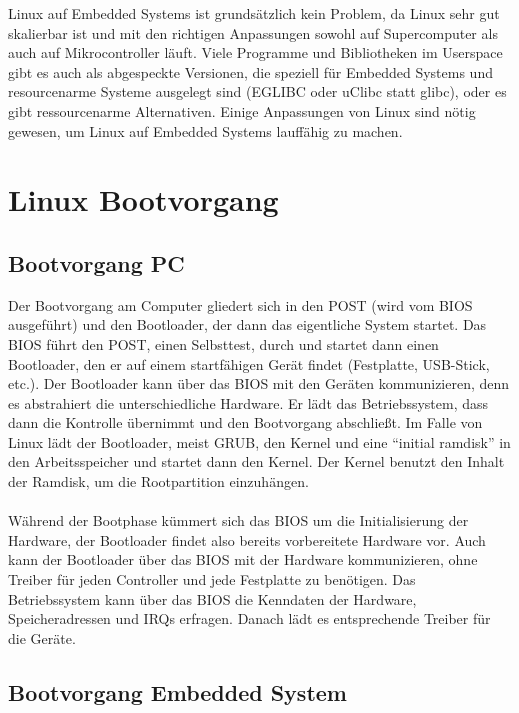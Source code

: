 \documentclass[a4paper]{article}
\begin{document}
Linux auf Embedded Systems ist grundsätzlich kein Problem, da Linux sehr gut skalierbar ist und mit den richtigen Anpassungen sowohl auf Supercomputer als auch auf Mikrocontroller läuft. Viele Programme und Bibliotheken im Userspace gibt es auch als abgespeckte Versionen, die speziell für Embedded Systems und resourcenarme Systeme ausgelegt sind (EGLIBC oder uClibc statt glibc), oder es gibt ressourcenarme Alternativen. Einige Anpassungen von Linux sind nötig gewesen, um Linux auf Embedded Systems lauffähig zu machen.

\section{Linux Bootvorgang}

\subsection{Bootvorgang PC}

Der Bootvorgang am Computer gliedert sich in den POST (wird vom BIOS ausgeführt) und den Bootloader, der dann das eigentliche System startet. Das BIOS führt den POST, einen Selbsttest, durch und startet dann einen Bootloader, den er auf einem startfähigen Gerät findet (Festplatte, USB-Stick, etc.). Der Bootloader kann über das BIOS mit den Geräten kommunizieren, denn es abstrahiert die unterschiedliche Hardware. Er lädt das Betriebssystem, dass dann die Kontrolle übernimmt und den Bootvorgang abschließt. Im Falle von Linux lädt der Bootloader, meist GRUB, den Kernel und eine “initial ramdisk” in den Arbeitsspeicher und startet dann den Kernel. Der Kernel benutzt den Inhalt der Ramdisk, um die Rootpartition einzuhängen.\\\\
Während der Bootphase kümmert sich das BIOS um die Initialisierung der Hardware, der Bootloader findet also bereits vorbereitete Hardware vor. Auch kann der Bootloader über das BIOS mit der Hardware kommunizieren, ohne Treiber für jeden Controller und jede Festplatte zu benötigen. Das Betriebssystem kann über das BIOS die Kenndaten der Hardware, Speicheradressen und IRQs erfragen. Danach lädt es entsprechende Treiber für die Geräte.

\subsection{Bootvorgang Embedded System}
\end{document}
